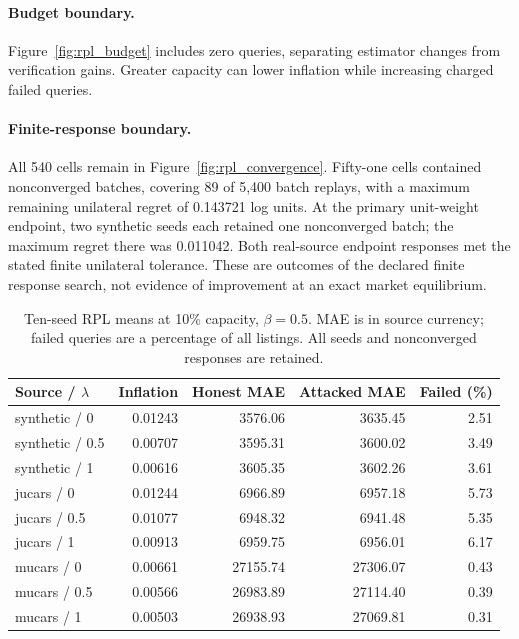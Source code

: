 \documentclass[11pt]{article}
\begin{document}
\paragraph{Budget boundary.}
Figure~\ref{fig:rpl_budget} includes zero queries, separating estimator changes
from verification gains. Greater capacity can lower inflation while increasing
charged failed queries.

\paragraph{Finite-response boundary.}
All 540 cells remain in Figure~\ref{fig:rpl_convergence}. Fifty-one cells
contained nonconverged batches, covering 89 of 5,400 batch replays, with a
maximum remaining unilateral regret of 0.143721 log units. At the primary
unit-weight endpoint, two synthetic seeds each retained one nonconverged batch;
the maximum regret there was 0.011042. Both real-source endpoint responses
met the stated finite unilateral tolerance. These are outcomes of the declared
finite response search, not evidence of improvement at an exact market
equilibrium.

\begin{table}[tbp]\centering\small
\caption{Ten-seed RPL means at 10\% capacity, $\beta=0.5$. MAE is in source
currency; failed queries are a percentage of all listings. All seeds and
nonconverged responses are retained.}\label{tab:rpl_primary}
\begin{tabular}{lrrrr}\toprule
Source / $\lambda$ & Inflation & Honest MAE & Attacked MAE & Failed (\%)\\\midrule
synthetic / 0 & 0.01243 & 3576.06 & 3635.45 & 2.51 \\
synthetic / 0.5 & 0.00707 & 3595.31 & 3600.02 & 3.49 \\
synthetic / 1 & 0.00616 & 3605.35 & 3602.26 & 3.61 \\
jucars / 0 & 0.01244 & 6966.89 & 6957.18 & 5.73 \\
jucars / 0.5 & 0.01077 & 6948.32 & 6941.48 & 5.35 \\
jucars / 1 & 0.00913 & 6959.75 & 6956.01 & 6.17 \\
mucars / 0 & 0.00661 & 27155.74 & 27306.07 & 0.43 \\
mucars / 0.5 & 0.00566 & 26983.89 & 27114.40 & 0.39 \\
mucars / 1 & 0.00503 & 26938.93 & 27069.81 & 0.31 \\
\bottomrule\end{tabular}\end{table}
\end{document}
